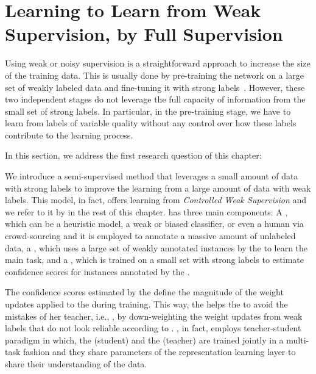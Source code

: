 \section{Learning to Learn from Weak Supervision, by Full Supervision}
\label{sec:meta_learning}
Using weak or noisy supervision is a straightforward approach to increase the size of the training data. This is usually done by pre-training the network on a large set of weakly labeled data and fine-tuning it with strong labels~\cite{Dehghani:2017:SIGIR,Severyn:2015:SIGIR}. 
However, these two independent stages do not leverage the full capacity of information from the small set of strong labels.  In particular, in the pre-training stage, we have to learn from labels of variable quality without any control over how these labels contribute to the learning process.

In this section, we address the first research question of this chapter:

We introduce a semi-supervised method that leverages a small amount of data with strong labels to improve the learning from a large amount of data with weak labels. This model, in fact, offers learning from \emph{Controlled Weak Supervision} and we refer to it by \emph{\cws} in the rest of this chapter.
%
\cws has three main components:
A \wa, which can be a heuristic model, a weak or biased classifier, or even a human via crowd-sourcing and it is employed to annotate a massive amount of unlabeled data, a \tnet, which uses a large set of weakly annotated instances by the \wa to learn the main task, and a \cnet, which is trained on a small set with strong labels to estimate confidence scores for instances annotated by the \wa. 

The confidence scores estimated by the \cnet define the magnitude of the weight updates applied to the \tnet during training. This way, the \cnet helps the \tnet to avoid the mistakes of her teacher, i.e., \wa, by down-weighting the weight updates from weak labels that do not look reliable according to \cnet.
%
\cws, in fact, employs teacher-student paradigm in which, the \tnet (student) and the \cnet (teacher) are trained jointly in a multi-task fashion and they share parameters of the representation learning layer to share their understanding of the data.

